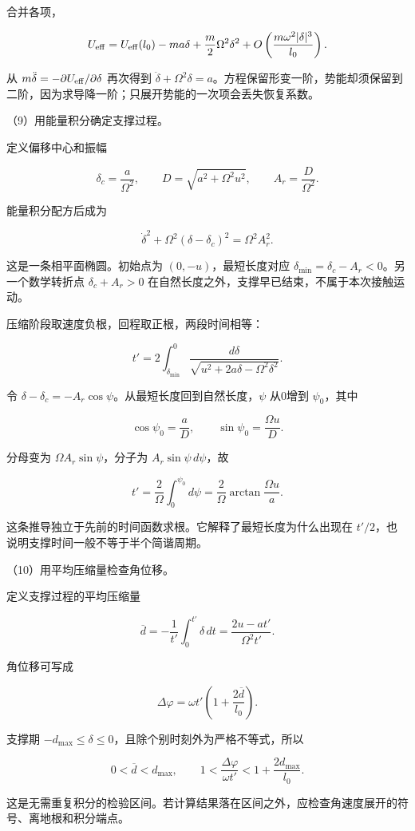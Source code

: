 \documentclass[12pt,a4paper,fontset=fandol]{ctexart}
\begin{document}
合并各项，

\[
U_{\rm eff}
=U_{\rm eff}(l_0)-ma\delta+\frac m2\Omega^2\delta^2
+O\left(\frac{m\omega^2|\delta|^3}{l_0}\right).
\]

从 \(m\ddot\delta=-\partial U_{\rm eff}/\partial\delta\) 再次得到
\(\ddot\delta+\Omega^2\delta=a\)。方程保留形变一阶，势能却须保留到二阶，因为求导降一阶；只展开势能的一次项会丢失恢复系数。

（9）用能量积分确定支撑过程。

定义偏移中心和振幅

\[
\delta_c=\frac a{\Omega^2},\qquad
D=\sqrt{a^2+\Omega^2u^2},\qquad
A_r=\frac D{\Omega^2}.
\]

能量积分配方后成为

\[
\dot\delta^2+\Omega^2(\delta-\delta_c)^2=\Omega^2A_r^2.
\]

这是一条相平面椭圆。初始点为 \((0,-u)\)，最短长度对应
\(\delta_{\min}=\delta_c-A_r<0\)。另一个数学转折点 \(\delta_c+A_r>0\)
在自然长度之外，支撑早已结束，不属于本次接触运动。

压缩阶段取速度负根，回程取正根，两段时间相等：

\[
t'=2\int_{\delta_{\min}}^0
\frac{d\delta}{\sqrt{u^2+2a\delta-\Omega^2\delta^2}}.
\]

令 \(\delta-\delta_c=-A_r\cos\psi\)。从最短长度回到自然长度，\(\psi\)
从0增到 \(\psi_0\)，其中

\[
\cos\psi_0=\frac aD,\qquad
\sin\psi_0=\frac{\Omega u}{D}.
\]

分母变为 \(\Omega A_r\sin\psi\)，分子为 \(A_r\sin\psi\,d\psi\)，故

\[
t'=\frac2\Omega\int_0^{\psi_0}d\psi
=\frac2\Omega\arctan\frac{\Omega u}{a}.
\]

这条推导独立于先前的时间函数求根。它解释了最短长度为什么出现在
\(t'/2\)，也说明支撑时间一般不等于半个简谐周期。

（10）用平均压缩量检查角位移。

定义支撑过程的平均压缩量

\[
\overline d=-\frac1{t'}\int_0^{t'}\delta\,dt
=\frac{2u-at'}{\Omega^2t'}.
\]

角位移可写成

\[
\Delta\varphi=\omega t'\left(1+\frac{2\overline d}{l_0}\right).
\]

支撑期 \(-d_{\max}\le\delta\le0\)，且除个别时刻外为严格不等式，所以

\[
0<\overline d<d_{\max},\qquad
1<\frac{\Delta\varphi}{\omega t'}
<1+\frac{2d_{\max}}{l_0}.
\]

这是无需重复积分的检验区间。若计算结果落在区间之外，应检查角速度展开的符号、离地根和积分端点。
\end{document}
